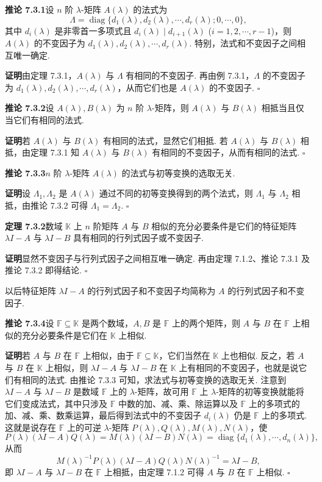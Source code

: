 \documentclass[UTF8,12pt,a4paper,fontset=fandol]{ctexart}
\begin{document}
\noindent\textbf{推论 7.3.1}\quad 设 $n$ 阶 $\lambda$-矩阵 $A(\lambda)$ 的法式为
\[
\Lambda=\operatorname{diag}\{d_1(\lambda),d_2(\lambda),\cdots,d_r(\lambda);0,\cdots,0\},
\]
其中 $d_i(\lambda)$ 是非零首一多项式且 $d_i(\lambda)\mid d_{i+1}(\lambda)$ ($i=1,2,\cdots,r-1$)，则 $A(\lambda)$ 的不变因子为 $d_1(\lambda),d_2(\lambda),\cdots,d_r(\lambda)$. 特别，法式和不变因子之间相互唯一确定.

\noindent\textbf{证明}\quad 由定理 7.3.1，$A(\lambda)$ 与 $\Lambda$ 有相同的不变因子. 再由例 7.3.1，$\Lambda$ 的不变因子为 $d_1(\lambda),d_2(\lambda),\cdots,d_r(\lambda)$，从而它们也是 $A(\lambda)$ 的不变因子. $\square$

\noindent\textbf{推论 7.3.2}\quad 设 $A(\lambda),B(\lambda)$ 为 $n$ 阶 $\lambda$-矩阵，则 $A(\lambda)$ 与 $B(\lambda)$ 相抵当且仅当它们有相同的法式.

\noindent\textbf{证明}\quad 若 $A(\lambda)$ 与 $B(\lambda)$ 有相同的法式，显然它们相抵. 若 $A(\lambda)$ 与 $B(\lambda)$ 相抵，由定理 7.3.1 知 $A(\lambda)$ 与 $B(\lambda)$ 有相同的不变因子，从而有相同的法式. $\square$

\noindent\textbf{推论 7.3.3}\quad $n$ 阶 $\lambda$-矩阵 $A(\lambda)$ 的法式与初等变换的选取无关.

\noindent\textbf{证明}\quad 设 $\Lambda_1,\Lambda_2$ 是 $A(\lambda)$ 通过不同的初等变换得到的两个法式，则 $\Lambda_1$ 与 $\Lambda_2$ 相抵，由推论 7.3.2 可得 $\Lambda_1=\Lambda_2$. $\square$

\noindent\textbf{定理 7.3.2}\quad 数域 $\mathbb{K}$ 上 $n$ 阶矩阵 $A$ 与 $B$ 相似的充分必要条件是它们的特征矩阵 $\lambda I-A$ 与 $\lambda I-B$ 具有相同的行列式因子或不变因子.

\noindent\textbf{证明}\quad 显然不变因子与行列式因子之间相互唯一确定. 再由定理 7.1.2、推论 7.3.1 及推论 7.3.2 即得结论. $\square$

以后特征矩阵 $\lambda I-A$ 的行列式因子和不变因子均简称为 $A$ 的行列式因子和不变因子.

\noindent\textbf{推论 7.3.4}\quad 设 $\mathbb{F}\subseteq\mathbb{K}$ 是两个数域，$A,B$ 是 $\mathbb{F}$ 上的两个矩阵，则 $A$ 与 $B$ 在 $\mathbb{F}$ 上相似的充分必要条件是它们在 $\mathbb{K}$ 上相似.

\noindent\textbf{证明}\quad 若 $A$ 与 $B$ 在 $\mathbb{F}$ 上相似，由于 $\mathbb{F}\subseteq\mathbb{K}$，它们当然在 $\mathbb{K}$ 上也相似. 反之，若 $A$ 与 $B$ 在 $\mathbb{K}$ 上相似，则 $\lambda I-A$ 与 $\lambda I-B$ 在 $\mathbb{K}$ 上有相同的不变因子，也就是说它们有相同的法式. 由推论 7.3.3 可知，求法式与初等变换的选取无关. 注意到 $\lambda I-A$ 与 $\lambda I-B$ 是数域 $\mathbb{F}$ 上的 $\lambda$-矩阵，故可用 $\mathbb{F}$ 上 $\lambda$-矩阵的初等变换就能将它们变成法式，其中只涉及 $\mathbb{F}$ 中数的加、减、乘、除运算以及 $\mathbb{F}$ 上的多项式的加、减、乘、数乘运算，最后得到法式中的不变因子 $d_i(\lambda)$ 仍是 $\mathbb{F}$ 上的多项式. 这就是说存在 $\mathbb{F}$ 上的可逆 $\lambda$-矩阵 $P(\lambda),Q(\lambda),M(\lambda),N(\lambda)$，使
\[
P(\lambda)(\lambda I-A)Q(\lambda)=M(\lambda)(\lambda I-B)N(\lambda)=\operatorname{diag}\{d_1(\lambda),\cdots,d_n(\lambda)\},
\]
从而
\[
M(\lambda)^{-1}P(\lambda)(\lambda I-A)Q(\lambda)N(\lambda)^{-1}=\lambda I-B,
\]
即 $\lambda I-A$ 与 $\lambda I-B$ 在 $\mathbb{F}$ 上相抵，由定理 7.1.2 可得 $A$ 与 $B$ 在 $\mathbb{F}$ 上相似. $\square$
\end{document}
